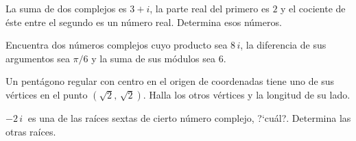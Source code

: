 \vspace{-8mm}
\begin{flushright}
\begin{footnotesize} \textcolor{gris}{}	\end{footnotesize}
\end{flushright}

\begin{mipropuesto}

La suma de dos complejos es $3+i$, la parte real del primero es $2$ y el cociente de éste entre el segundo es un número real. Determina esos números.
\end{mipropuesto}

\vspace{-8mm}
\begin{flushright}
\begin{footnotesize} \textcolor{gris}{}	\end{footnotesize}
\end{flushright}


\begin{mipropuesto}

Encuentra dos números complejos cuyo producto sea $8\, i$, la diferencia de sus argumentos sea $\pi/6$ y la suma de sus módulos sea 6.
\end{mipropuesto}

\vspace{-8mm}
\begin{flushright}
\begin{footnotesize} \textcolor{gris}{}	\end{footnotesize}
\end{flushright}

\begin{mipropuesto}

Un pentágono regular con centro en el origen de coordenadas tiene uno de sus vértices en el punto $(\sqrt 2,\, \sqrt 2)$. Halla los otros vértices y la longitud de su lado.
\end{mipropuesto}

\begin{mipropuesto}

$-2\, i\ $ es una de las raíces sextas de cierto número complejo, ?`cuál?. Determina las otras raíces.
\end{mipropuesto}

